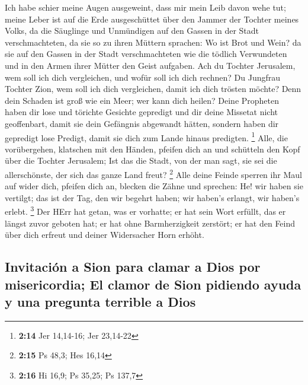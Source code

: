  Ich habe schier meine Augen ausgeweint, dass mir mein
Leib davon wehe tut; meine Leber ist auf die Erde ausgeschüttet über den
Jammer der Tochter meines Volks, da die Säuglinge und Unmündigen auf den
Gassen in der Stadt verschmachteten,  da sie so zu ihren
Müttern sprachen: Wo ist Brot und Wein? da sie auf den Gassen in der
Stadt verschmachteten wie die tödlich Verwundeten und in den Armen ihrer
Mütter den Geist aufgaben.  Ach du Tochter Jerusalem, wem
soll ich dich vergleichen, und wofür soll ich dich rechnen? Du Jungfrau
Tochter Zion, wem soll ich dich vergleichen, damit ich dich trösten
möchte? Denn dein Schaden ist groß wie ein Meer; wer kann dich heilen?
 Deine Propheten haben dir lose und törichte Gesichte
gepredigt und dir deine Missetat nicht geoffenbart, damit sie dein
Gefängnis abgewandt hätten, sondern haben dir gepredigt lose Predigt,
damit sie dich zum Lande hinaus predigten. \footnote{\textbf{2:14} Jer
  14,14-16; Jer 23,14-22}  Alle, die vorübergehen,
klatschen mit den Händen, pfeifen dich an und schütteln den Kopf über
die Tochter Jerusalem; Ist das die Stadt, von der man sagt, sie sei die
allerschönste, der sich das ganze Land freut? \footnote{\textbf{2:15} Ps
  48,3; Hes 16,14}  Alle deine Feinde sperren ihr Maul
auf wider dich, pfeifen dich an, blecken die Zähne und sprechen: He! wir
haben sie vertilgt; das ist der Tag, den wir begehrt haben; wir haben's
erlangt, wir haben's erlebt. \footnote{\textbf{2:16} Hi 16,9; Ps 35,25;
  Ps 137,7}  Der HErr hat getan, was er vorhatte; er hat
sein Wort erfüllt, das er längst zuvor geboten hat; er hat ohne
Barmherzigkeit zerstört; er hat den Feind über dich erfreut und deiner
Widersacher Horn erhöht.

\hypertarget{invitaciuxf3n-a-sion-para-clamar-a-dios-por-misericordia-el-clamor-de-sion-pidiendo-ayuda-y-una-pregunta-terrible-a-dios}{%
\subsection{Invitación a Sion para clamar a Dios por misericordia; El
clamor de Sion pidiendo ayuda y una pregunta terrible a
Dios}\label{invitaciuxf3n-a-sion-para-clamar-a-dios-por-misericordia-el-clamor-de-sion-pidiendo-ayuda-y-una-pregunta-terrible-a-dios}}

